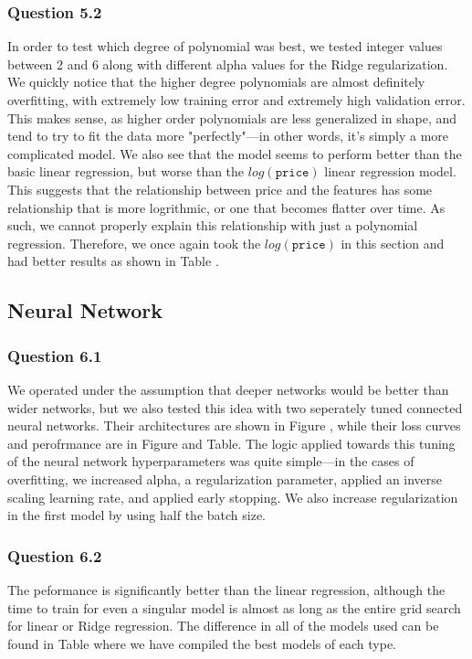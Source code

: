 \documentclass[11pt,letterpaper]{article}
\begin{document}
\subsubsection*{Question 5.2}
In order to test which degree of polynomial was best, we tested integer values between 2 and 6 along with 
different alpha values for the Ridge regularization. We quickly notice that the higher degree polynomials 
are almost definitely overfitting, with extremely low training error and extremely high validation error.
This makes sense, as higher order polynomials are less generalized in shape, and tend to try to fit the data 
more "perfectly"—in other words, it's simply a more complicated model. We also see that the 
model seems to perform better than the basic linear regression, but worse than the $log(\texttt{price})$ 
linear regression model. This suggests that the relationship between price and the features has 
some relationship that is more logrithmic, or one that becomes flatter over time. As such, we cannot 
properly explain this relationship with just a polynomial regression. Therefore, we once again 
took the $log(\texttt{price})$ in this section and had better results as shown in Table .
\subsection*{Neural Network}
\subsubsection*{Question 6.1}
We operated under the assumption that deeper networks would be better than wider networks, but we also 
tested this idea with two seperately tuned connected neural networks. Their architectures are shown in 
Figure , while their loss curves and perofrmance are in Figure and Table. The logic applied towards this 
tuning of the neural network hyperparameters was quite simple—in the cases of overfitting, we increased 
alpha, a regularization parameter, applied an inverse scaling learning rate, and applied early stopping. 
We also increase regularization in the first model by using half the batch size. 

\subsubsection*{Question 6.2}
The peformance is significantly better than the linear regression, although the time to train for even a singular 
model is almost as long as the entire grid search for linear or Ridge regression. The difference in all of the models
used can be found in Table where we have compiled the best models of each type. 
\end{document}
